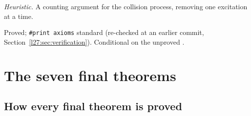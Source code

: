 \begin{physics}
\emph{Heuristic.} A counting argument for the collision process, removing one excitation at a time.
\end{physics}

\begin{status}
Proved; \texttt{\#print axioms} standard (re-checked at an earlier commit, Section~\ref{l27:sec:verification}). Conditional on the
unproved .
\end{status}

\section{The seven final theorems}\label{l27:sec:finals}

\subsection{How every final theorem is proved}\label{l27:sec:commonproof}

